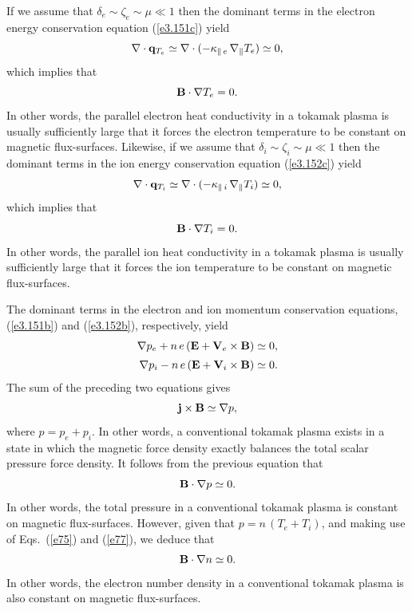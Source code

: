 \documentclass[notitlepage,12pt]{article}
\begin{document}
If we assume that $\delta_e\sim \zeta_e\sim \mu\ll 1$ then the dominant terms in the electron energy conservation equation
(\ref{e3.151c}) yield
\begin{equation}
\nabla\cdot{\bf q}_{T_e}\simeq \nabla\cdot(-\kappa_{\parallel\,e}\,\nabla_\parallel T_e)\simeq 0,
\end{equation}
which implies that 
\begin{equation}
{\bf B}\cdot\nabla T_e=0. \label{e75}
\end{equation}
In other words, the parallel electron heat conductivity in a tokamak plasma is usually
sufficiently large that it forces the electron temperature to be constant on magnetic flux-surfaces. 
Likewise, if we assume that $\delta_i\sim \zeta_i\sim \mu\ll 1$ then the dominant terms in the ion energy conservation equation
(\ref{e3.152c}) yield
\begin{equation}
\nabla\cdot{\bf q}_{T_i}\simeq \nabla\cdot(-\kappa_{\parallel\,i}\,\nabla_\parallel T_i)\simeq 0,
\end{equation}
which implies that 
\begin{equation}
{\bf B}\cdot\nabla T_i=0.\label{e77}
\end{equation}
In other words, the parallel ion heat conductivity in a tokamak plasma is usually
sufficiently large that it forces the ion temperature to be constant on magnetic flux-surfaces. 

 The dominant terms in the electron and ion momentum conservation equations,
(\ref{e3.151b}) and (\ref{e3.152b}), respectively, yield
\begin{align}\label{e78}
\nabla p_e + n\,e\,({\bf E}+{\bf V}_e\times {\bf B}) &\simeq 0,\\[0.5ex]
\nabla p_i - n\,e\,({\bf E}+{\bf V}_i\times {\bf B}) &\simeq 0.\label{e79}
\end{align}
The sum of the preceding two equations gives
\begin{equation}\label{e80}
 {\bf j}\times {\bf B} \simeq\nabla p,
\end{equation}
where $p=p_e+p_i$. In other words, a conventional tokamak plasma exists in a state in which the magnetic force density exactly balances the  total scalar pressure force density. 
It follows from the previous equation that 
\begin{equation}
{\bf B}\cdot\nabla p\simeq 0.
\end{equation}
In other words, the total pressure in a conventional tokamak plasma is constant on magnetic flux-surfaces. 
 However, given that $p=n\,(T_e+T_i)$, and making use of Eqs.~(\ref{e75}) and (\ref{e77}), we deduce that 
\begin{equation}
{\bf B}\cdot\nabla n\simeq 0.
\end{equation}
In other words, the electron number density in a conventional tokamak plasma is also  constant on
magnetic flux-surfaces. 
\end{document}
